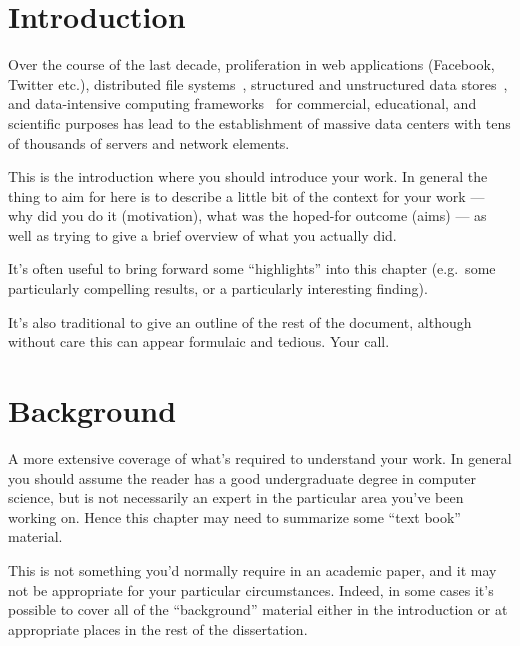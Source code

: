 \documentclass[a4paper,12pt,twoside,openright]{report}
\begin{document}
\pagestyle{empty}
\singlespacing

\onehalfspacing

\singlespacing


\setcounter{page}{0}
\pagestyle{plain}
\tableofcontents
\listoffigures
\listoftables

\onehalfspacing


\chapter{Introduction}
\setcounter{page}{1} 

Over the course of the last decade, proliferation in web applications (Facebook,
Twitter etc.), distributed file systems~\cite{Ghemawat:2003:GFS}, structured and
unstructured data stores~\cite{Chang:2006:BDS,DeCandia:2007:DAH}, and
data-intensive computing
frameworks~\cite{Dean:2004:MSD,Isard:2007:DDD,Murray:2011:CUE} for commercial,
educational, and scientific purposes has lead to the establishment of massive
data centers with tens of thousands of servers and network elements.

This is the introduction where you should introduce your work.  In
general the thing to aim for here is to describe a little bit of the
context for your work --- why did you do it (motivation), what was the
hoped-for outcome (aims) --- as well as trying to give a brief
overview of what you actually did.

It's often useful to bring forward some ``highlights'' into 
this chapter (e.g.\ some particularly compelling results, or 
a particularly interesting finding). 

It's also traditional to give an outline of the rest of the
document, although without care this can appear formulaic 
and tedious. Your call. 


\chapter{Background} 

A more extensive coverage of what's required to understand your 
work. In general you should assume the reader has a good undergraduate 
degree in computer science, but is not necessarily an expert in 
the particular area you've been working on. Hence this chapter 
may need to summarize some ``text book'' material. 

This is not something you'd normally require in an academic paper, 
and it may not be appropriate for your particular circumstances. 
Indeed, in some cases it's possible to cover all of the ``background'' 
material either in the introduction or at appropriate places in 
the rest of the dissertation. 
\end{document}
